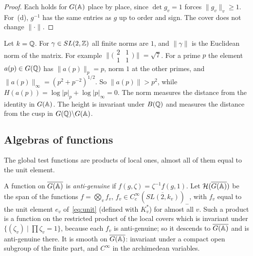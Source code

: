 \begin{proof}
Each holds for $G(\mathbb{A})$ place by place, since $\det g_v=1$ forces
$\|g_v\|_v\ge1$. For~(d), $g^{-1}$ has the same entries as $g$ up to
order and sign. The cover does not change $\|\cdot\|$.
\end{proof}

\begin{example}\label{ex:norm-global}
Let $k=\mathbb{Q}$. For $\gamma\in SL(2,\mathbb{Z})$ all finite norms are $1$, and
$\|\gamma\|$ is the Euclidean norm of the matrix. For example
$\|\bigl(\begin{smallmatrix}2&1\\1&1\end{smallmatrix}\bigr)\|=\sqrt7$. For
a prime $p$ the element $a(p)\in G(\mathbb{Q})$ has $\|a(p)\|_p=p$, norm $1$ at
the other primes, and $\|a(p)\|_\infty=(p^2+p^{-2})^{1/2}$. So
$\|a(p)\|>p^2$, while $H(a(p))=\log|p|_p+\log|p|_\infty=0$. The norm
measures the distance from the identity in $G(\mathbb{A})$. The height is
invariant under $B(\mathbb{Q})$ and measures the distance from the cusp in
$G(\mathbb{Q})\backslash G(\mathbb{A})$.
\end{example}

\subsection{Algebras of functions}

The global test functions are products of local ones, almost all of
them equal to the unit element.


A function on $\overline{G(\mathbb{A})}$ is \emph{anti-genuine} if
$f(g,\zeta)=\zeta^{-1}f(g,1)$. Let $\mathcal H(\overline{G(\mathbb{A})})$ be the
span of the functions $f=\bigotimes_vf_v$, $f_v\in
C_c^\infty(\overline{SL(2,k_v)})_-$, with $f_v$ equal to the unit element
$e_v$ of~\eqref{eq:unit} (defined with $K_v^*$) for almost all $v$. Such
a product is a function on the restricted product of the local covers
which is invariant under $\{(\zeta_v)\mid\prod\zeta_v=1\}$, because each
$f_v$ is anti-genuine; so it descends to $\overline{G(\mathbb{A})}$ and is
anti-genuine there. It is smooth on $\overline{G(\mathbb{A})}$: invariant under a
compact open subgroup of the finite part, and $C^\infty$ in the
archimedean variables.

